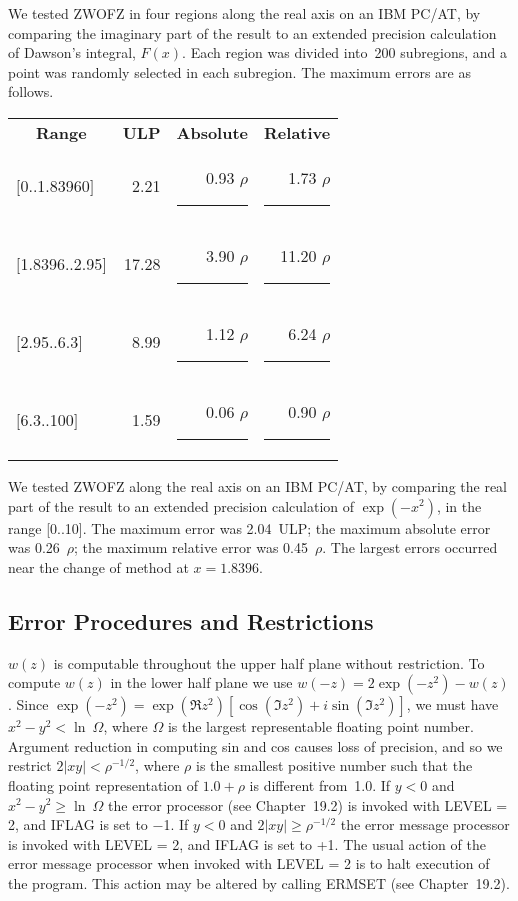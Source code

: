 \documentclass[twoside]{MATH77}
\begin{document}
We tested ZWOFZ in four regions along the real axis on an IBM PC/AT, by
comparing the imaginary part of the result to an extended precision
calculation of Dawson's integral, $F(x)$. Each region was divided into~200
subregions, and a point was randomly selected in each subregion. The maximum
errors are as follows.\vspace{-5pt}
\begin{center}
\begin{tabular}{lrrr}
\multicolumn{1}{c}{\bf Range} & {\bf ULP} &
\multicolumn{1}{c}{\bf Absolute} & \multicolumn{1}{c}{\bf Relative}\\
$[$0..1.83960$]$ & 2.21 & 0.93 $\rho $\rule{.1in}{0pt} & 1.73 $\rho $\rule{.05in}{0pt}\\
$[$1.8396..2.95$]$ & 17.28 & 3.90 $\rho $\rule{.1in}{0pt} & 11.20 $\rho $\rule{.05in}{0pt}\\
$[$2.95..6.3$]$ & 8.99 & 1.12 $\rho $\rule{.1in}{0pt} & 6.24 $\rho $\rule{.05in}{0pt}\\
$[$6.3..100$]$ & 1.59 & 0.06 $\rho $\rule{.1in}{0pt} & 0.90 $\rho $\rule{.05in}{0pt}
\end{tabular}
\end{center}\vspace{-5pt}
We tested ZWOFZ along the real axis on an IBM PC/AT, by comparing the real
part of the result to an extended precision calculation of $\exp (-x^2)$, in
the range [0..10]. The maximum error was 2.04~ULP; the maximum absolute
error was 0.26\ $\rho $; the maximum relative error was 0.45\ $\rho $. The
largest errors occurred near the change of method at $x = 1.8396.$




\subsection{Error Procedures and Restrictions}

$w(z)$ is computable throughout the upper half plane without restriction. To
compute $w(z)$ in the lower half plane we use $w(-z) = 2 \exp (-z^2)-w(z)$.
Since $\exp (-z^2) = \exp (\Re z^2) [\cos (\Im z^2) + i \sin(\Im z^2)]$, we
must have $x^2 - y^2 < \ln \ \Omega $, where $\Omega $ is the largest
representable floating point number. Argument reduction in computing sin and
cos causes loss of precision, and so we restrict $2|xy| < \rho ^{-1/2}$,
where $\rho $ is the smallest positive number such that the floating point
representation of $1.0 + \rho $ is different from~1.0. If $y < 0$ and $x^2 -
y^2 \geq \ln \ \Omega $ the error processor (see Chapter~19.2) is invoked
with LEVEL = 2, and IFLAG is set to $-$1. If $y < 0$ and $2|xy| \geq \rho
^{-1/2}$ the error message processor is invoked with LEVEL = 2, and IFLAG is
set to +1. The usual action of the error message processor when invoked with
LEVEL = 2 is to halt execution of the program. This action may be altered by
calling ERMSET (see Chapter~19.2).
\end{document}
